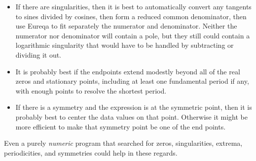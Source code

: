 \documentclass[12pt,english]{article}
\begin{document}
\begin{itemize}
\item If there are singularities, then it is best to automatically convert
any tangents to sines divided by cosines, then form a reduced common
denominator, then use Eureqa to fit separately the numerator and denominator.
Neither the numerator nor denominator will contain a pole, but they
still could contain a logarithmic singularity that would have to be
handled by subtracting or dividing it out. \vspace{-5pt}

\item It is probably best if the endpoints extend modestly beyond all of
the real zeros and stationary points, including at least one fundamental
period if any, with enough points to resolve the shortest period.\vspace{-5pt}

\item If there is a symmetry and the expression is  at the
symmetric point, then it is probably best to center the data values
on that point. Otherwise it might be more efficient to make that symmetry
point be one of the end points.\vspace{-5pt}

\end{itemize}
Even a purely \textsl{numeric} program that searched for zeros, singularities,
extrema, periodicities, and symmetries could help in these regards.\vspace{-5pt}
\end{document}
